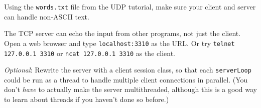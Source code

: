
\STEP Using the \texttt{words.txt} file from the UDP tutorial, make sure
your client and server can handle non-ASCII text.

The TCP server can echo the input from other programs, not just the client.
Open a web browser and type \texttt{localhost:3310} as the URL.
Or try \texttt{telnet 127.0.0.1 3310}
or \texttt{ncat 127.0.0.1 3310} as the client. 

\emph{Optional}: Rewrite the server with a client session class, so that
each \texttt{serverLoop}
could be run as a thread to handle multiple client connections in parallel.
(You don't \emph{have} to actually make the server multithreaded, although
this is a good way to learn about threads if you haven't done so before.)


\COPYRIGHT


